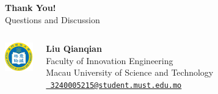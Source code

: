 \documentclass{beamer}
\begin{document}
\begin{frame}
    \centering
    \vspace{1em}
    \Huge \textbf{Thank You!} \\
    \vspace{1.5em}
    \LARGE Questions and Discussion \\
    \vspace{2em}
    \begin{columns}[c]
        \centering
        \includegraphics[height=1.2cm]{images/must-logo.png}
        
        \begin{flushleft}
            \large
            \textbf{Liu Qianqian} \\
            Faculty of Innovation Engineering \\
            Macau University of Science and Technology \\
            \faEnvelopeO \href{mailto:3240005215@student.must.edu.mo}{\texttt{\ 3240005215@student.must.edu.mo}}
        \end{flushleft}
    \end{columns}
\end{frame}
\end{document}
